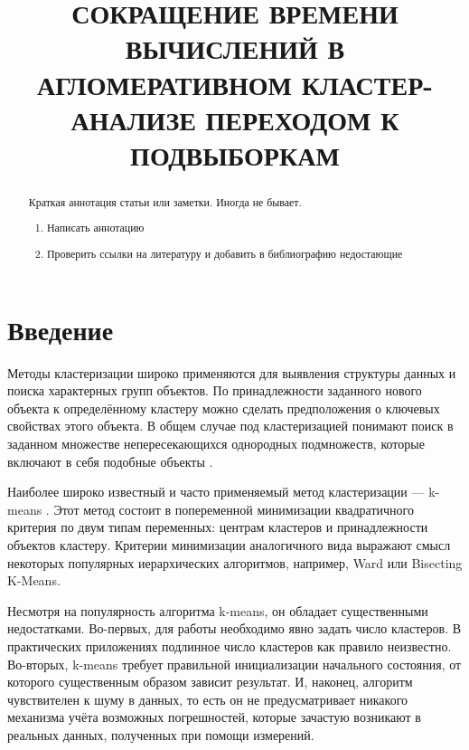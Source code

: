 \documentclass[12pt]{a&t}
\begin{document}

\title{СОКРАЩЕНИЕ ВРЕМЕНИ ВЫЧИСЛЕНИЙ В АГЛОМЕРАТИВНОМ КЛАСТЕР-АНАЛИЗЕ ПЕРЕХОДОМ К ПОДВЫБОРКАМ}


\maketitle

\begin{abstract}
Краткая аннотация статьи или заметки. Иногда не бывает. 
\begin{enumerate}
	\item Написать аннотацию
	\item Проверить ссылки на литературу и добавить в библиографию недостающие
\end{enumerate}
\end{abstract}


\section{Введение}

Методы кластеризации широко применяются для выявления структуры данных и поиска характерных групп объектов. По принадлежности заданного нового объекта к определённому кластеру можно сделать предположения о ключевых свойствах этого объекта. В общем случае под кластеризацией понимают  поиск в заданном множестве  непересекающихся однородных подмножеств, которые включают в себя подобные объекты \cite{Mirkin-Vvedenie-v-analiz-dannyh}.
 
Наиболее широко известный и часто применяемый метод кластеризации --- \mbox{k-means} \cite{K-Means-canonical}. Этот метод состоит в попеременной минимизации квадратичного критерия по двум типам переменных: центрам кластеров и принадлежности объектов кластеру. Критерии минимизации аналогичного вида выражают смысл некоторых популярных иерархических алгоритмов, например, Ward \cite{Ward-canonical} или Bisecting \mbox{K-Means}\cite{Mirkin-Clustering-A-Data-Recovery-Approach}.

Несмотря на популярность алгоритма \mbox{k-means}, он обладает существенными недостатками. Во-первых, для работы необходимо явно задать число кластеров. В практических приложениях подлинное число кластеров как правило неизвестно. Во-вторых, \mbox{k-means} требует правильной инициализации начального состояния, от которого существенным образом зависит результат. И, наконец, алгоритм чувствителен к шуму в данных, то есть он не предусматривает никакого механизма учёта возможных погрешностей, которые зачастую возникают в реальных данных, полученных при помощи измерений.
\end{document}
